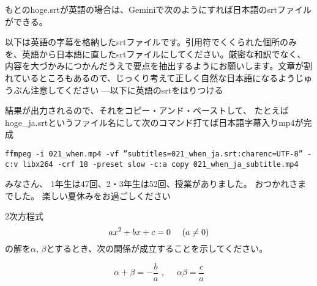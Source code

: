 \documentclass[12pt,jafontscale=0.9247]{jlreq}
\begin{document}
\bigskip

もとのhoge.srtが英語の場合は、Geminiで次のようにすれば日本語のsrtファイルができる。
\begin{tcolorbox}
 以下は英語の字幕を格納したsrtファイルです。引用符でくくられた個所のみを、英語から日本語に直したsrtファイルにしてください。厳密な和訳でなく、内容を大づかみにつかんだうえで要点を抽出するようにお願いします。文章が割れているところもあるので、じっくり考えて正しく自然な日本語になるようじゅうぶん注意してください
---以下に英語のsrtをはりつける
\end{tcolorbox}

結果が出力されるので、それをコピー・アンド・ペーストして、
たとえばhoge\_ja.srtというファイル名にして次のコマンド打てば日本語字幕入りmp4が完成

\begin{verbatim}
ffmpeg -i 021_when.mp4 -vf ”subtitles=021_when_ja.srt:charenc=UTF-8” -c:v libx264 -crf 18 -preset slow -c:a copy 021_when_ja_subtitle.mp4
\end{verbatim}

\newpage
\vfill

{\gtfamily\bfseries

みなさん、
1年生は47回、2・3年生は52回、授業がありました。
おつかれさまでした。
楽しい夏休みをお過ごしください
}

%


2次方程式
\[
 ax^2+bx+c=0\,\,\,\,\,\,\,\,\text(a\neq{}0\text)
\]
の解を$\alpha$, $\beta$とするとき、次の関係が成立することを示してください。

\begin{tcolorbox}
 \[
 \alpha + \beta = -\frac{b}{a}\,\,,\,\,\,\,\,\,\,\,\alpha\beta = \frac{c}{a}
\]

\end{tcolorbox}
\end{document}
